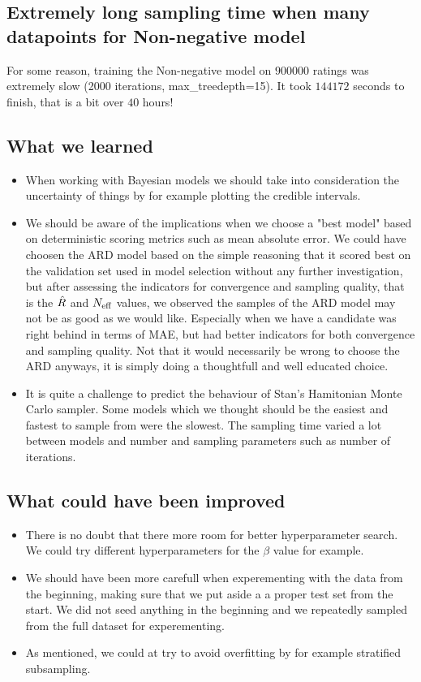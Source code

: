 \documentclass[12pt]{article}
\begin{document}
    \subsection*{Extremely long sampling time when many datapoints for Non-negative model}
    For some reason, training the Non-negative model on $900000$ ratings was extremely slow (2000 iterations, max\_treedepth=15). It took $144172$ seconds to finish, that is a bit over $40$ hours! 

    \subsection*{What we learned}
    \begin{itemize}
        \item When working with Bayesian models we should take into consideration the uncertainty of things by for example plotting the credible intervals. 
        \item We should be aware of the implications when we choose a "best model" based on deterministic scoring metrics such as mean absolute error. We could have choosen the ARD model based on the simple reasoning that it scored best on the validation set used in model selection without any further investigation, but after assessing the indicators for convergence and sampling quality, that is the $\hat{R}$ and $N_{\text{eff}}$ values, we observed the samples of the ARD model may not be as good as we would like. Especially when we have a candidate was right behind in terms of MAE, but had better indicators for both convergence and sampling quality. Not that it would necessarily be wrong to choose the ARD anyways, it is simply doing a thoughtfull and well educated choice.
        \item It is quite a challenge to predict the behaviour of Stan's Hamitonian Monte Carlo sampler. Some models which we thought should be the easiest and fastest to sample from were the slowest. The sampling time varied a lot between models and number and sampling parameters such as number of iterations. 
    \end{itemize}

    \subsection*{What could have been improved}
    \begin{itemize}
        \item There is no doubt that there more room for better hyperparameter search. We could try different hyperparameters for the $\beta$ value for example.
        \item We should have been more carefull when experementing with the data from the beginning, making sure that we put aside a a proper test set from the start. We did not seed anything in the beginning and we repeatedly sampled from the full dataset for experementing. 
        \item As mentioned, we could at try to avoid overfitting by for example stratified subsampling.
    \end{itemize}
\end{document}
